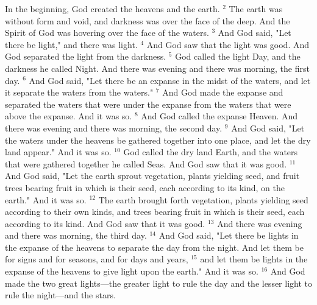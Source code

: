 \documentclass[10pt]{extarticle}
\begin{document}

    \medskip
    In the beginning, God created the heavens and the earth.
    $^{2}$ The earth was without form and void, and darkness was over the face of the deep. And the Spirit of God was hovering over the face of the waters.
    $^{3}$ And God said, "Let there be light," and there was light.
    $^{4}$ And God saw that the light was good. And God separated the light from the darkness.
    $^{5}$ God called the light Day, and the darkness he called Night. And there was evening and there was morning, the first day.
    $^{6}$ And God said, "Let there be an expanse in the midst of the waters, and let it separate the waters from the waters."
    $^{7}$ And God made the expanse and separated the waters that were under the expanse from the waters that were above the expanse. And it was so.
    $^{8}$ And God called the expanse Heaven. And there was evening and there was morning, the second day.
    $^{9}$ And God said, "Let the waters under the heavens be gathered together into one place, and let the dry land appear." And it was so.
    $^{10}$ God called the dry land Earth, and the waters that were gathered together he called Seas. And God saw that it was good.
    $^{11}$ And God said, "Let the earth sprout vegetation, plants yielding seed, and fruit trees bearing fruit in which is their seed, each according to its kind, on the earth." And it was so.
    $^{12}$ The earth brought forth vegetation, plants yielding seed according to their own kinds, and trees bearing fruit in which is their seed, each according to its kind. And God saw that it was good.
    $^{13}$ And there was evening and there was morning, the third day.
    $^{14}$ And God said, "Let there be lights in the expanse of the heavens to separate the day from the night. And let them be for signs and for seasons, and for days and years,
    $^{15}$ and let them be lights in the expanse of the heavens to give light upon the earth." And it was so.
    $^{16}$ And God made the two great lights—the greater light to rule the day and the lesser light to rule the night—and the stars.
\end{document}
